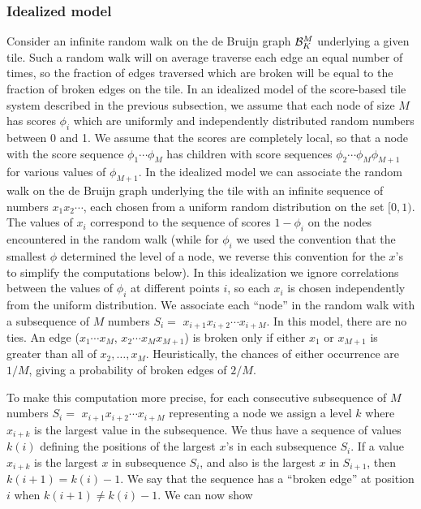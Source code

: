 \documentclass[12pt]{article}
\begin{document}
\subsubsection{Idealized model}

Consider an infinite random walk on the de Bruijn graph ${\cal B}_K^M$
underlying a given tile.  Such a random walk will on average traverse
each edge an equal number of times, so the fraction of edges traversed
which are broken will be equal to the fraction of broken edges on the
tile.  In an idealized model of the score-based tile system described
in the previous subsection, we assume that each node of size $M$ has
scores $\phi_i$ which are uniformly and independently distributed
random numbers between 0 and 1.  We assume that the scores are
completely local, so that a node with the score sequence $\phi_1
\cdots \phi_M$ has children with score sequences $\phi_2 \cdots \phi_M
\phi_{M + 1}$ for various values of $\phi_{M + 1}$.  In the idealized
model we can associate the random walk on the de Bruijn graph
underlying the tile with an infinite sequence of numbers $x_1 x_2
\cdots$, each chosen from a uniform random distribution on the set
$[0, 1)$.  The values of $x_i$ correspond to the sequence of scores
$1-\phi_i$ on the nodes encountered in the random walk (while for
  $\phi_i$ we used the convention that the smallest $\phi$ determined
  the level of a node, we reverse this convention for the $x$'s to
  simplify the computations below).  In this
idealization we ignore correlations between the values of $\phi_i$ at
different points $i$, so each $x_i$ is chosen independently from the
uniform distribution.  We associate each ``node'' in the random walk
with a subsequence of $M$ numbers $S_i =$ $x_{i + 1}x_{i + 2} \cdots
x_{i + M}$.  In this model, there are no ties.  An edge ($x_1 \cdots
x_M$, $x_2 \cdots x_M x_{M + 1}$) is broken only if either $x_1$ or
$x_{M + 1}$ is greater than all of $x_2, \ldots, x_M$.  Heuristically,
the chances of either occurrence are $1/M$, giving a probability of
broken edges of $2/M$.

To make this computation more precise, for each consecutive
subsequence of $M$ numbers $S_i =$ $x_{i + 1}x_{i + 2} \cdots x_{i +
M}$ representing a node we assign a level $k$ where $x_{i + k}$ is the
largest value in the subsequence.  We thus have a sequence of values
$k (i)$ defining the positions of the largest $x$'s in each
subsequence $S_i$.  If a value $x_{i + k}$ is the largest $x$ in
subsequence $S_i$, and also is the largest $x$ in $S_{i + 1}$, then $k
(i + 1) = k (i) -1$.  We say that the sequence has a ``broken edge''
at position $i$ when $k (i + 1) \neq k (i) -1$.  We can now show
\vspace*{0.1in}
\end{document}
